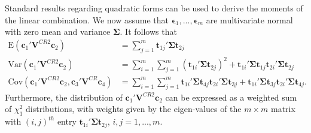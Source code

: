 \documentclass[12pt]{article}\usepackage[]{graphicx}\usepackage[]{color}
\newcommand{\E}{\text{E}}
\newcommand{\Cov}{\text{Cov}}
\newcommand{\Var}{\text{Var}}
\newcommand{\bm}{\mathbf}
\newcommand{\bs}{\boldsymbol}
\begin{document}
Standard results regarding quadratic forms can be used to derive the moments of the linear combination. We now assume that $\bs\epsilon_1,...,\bs\epsilon_m$ are multivariate normal with zero mean and variance $\bs\Sigma$. It follows that 
\begin{align}
\label{eq:CRVE_expectation}
\E\left(\bm{c}_1' \bm{V}^{CR2} \bm{c}_2\right) &= \sum_{j=1}^m \bm{t}_{1j}' \bs\Sigma \bm{t}_{2j} \\
\label{eq:CRVE_variance}
\Var\left(\bm{c}_1' \bm{V}^{CR2} \bm{c}_2\right) &= \sum_{i=1}^m \sum_{j=1}^m \left(\bm{t}_{1i}' \bs\Sigma \bm{t}_{2j}\right)^2 + \bm{t}_{1i}' \bs\Sigma \bm{t}_{1j} \bm{t}_{2i}' \bs\Sigma \bm{t}_{2j} \\
\label{eq:CRVE_covariance}
\Cov\left(\bm{c}_1' \bm{V}^{CR2} \bm{c}_2, \bm{c}_3' \bm{V}^{CR} \bm{c}_4\right) &= \sum_{i=1}^m \sum_{j=1}^m \bm{t}_{1i}' \bs\Sigma \bm{t}_{4j} \bm{t}_{2i}' \bs\Sigma \bm{t}_{3j} + \bm{t}_{1i}' \bs\Sigma \bm{t}_{3j} \bm{t}_{2i}' \bs\Sigma \bm{t}_{4j}.
\end{align}
Furthermore, the distribution of $\bm{c}_1' \bm{V}^{CR2} \bm{c}_2$ can be expressed as a weighted sum of $\chi^2_1$ distributions, with weights given by the eigen-values of the $m \times m$ matrix with $\left(i,j\right)^{th}$ entry $\bm{t}_{1i}' \bs\Sigma \bm{t}_{2j}$, $i,j=1,...,m$.



\end{document}
